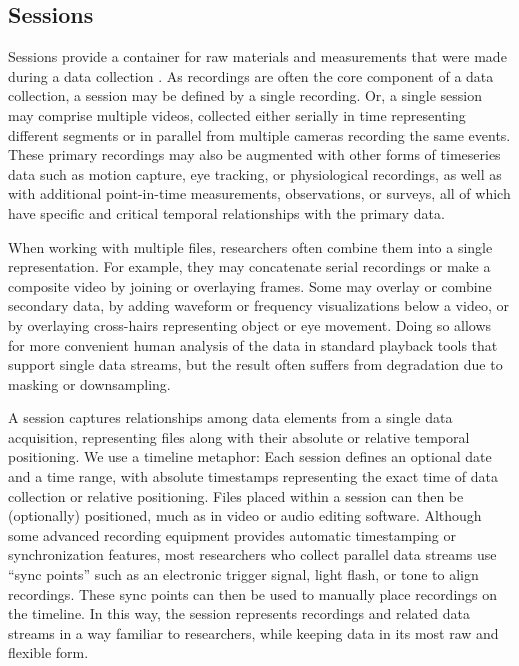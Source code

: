 \documentclass{sig-alternate}
\begin{document}
\subsection{Sessions}

Sessions provide a container for raw materials and measurements that were made during a data collection \cite{Bakeman_2012}.
As recordings are often the core component of a data collection, a session may be defined by a single recording.
Or, a single session may comprise multiple videos, collected either serially in time representing different segments or in parallel from multiple cameras recording the same events.
These primary recordings may also be augmented with other forms of timeseries data such as motion capture, eye tracking, or physiological recordings, as well as with additional point-in-time measurements, observations, or surveys, all of which have specific and critical temporal relationships with the primary data.

When working with multiple files, researchers often combine them into a single representation.
For example, they may concatenate serial recordings or make a composite video by joining or overlaying frames.
Some may overlay or combine secondary data, by adding waveform or frequency visualizations below a video, or by overlaying cross-hairs representing object or eye movement.
Doing so allows for more convenient human analysis of the data in standard playback tools that support single data streams, but the result often suffers from degradation due to masking or downsampling.

A session captures relationships among data elements from a single data acquisition, representing files along with their absolute or relative temporal positioning.
We use a timeline metaphor: Each session defines an optional date and a time range, with absolute timestamps representing the exact time of data collection or relative positioning.
Files placed within a session can then be (optionally) positioned, much as in video or audio editing software.
Although some advanced recording equipment provides automatic timestamping or synchronization features, most researchers who collect parallel data streams use ``sync points'' such as an electronic trigger signal, light flash, or tone to align recordings.
These sync points can then be used to manually place recordings on the timeline.
In this way, the session represents recordings and related data streams in a way familiar to researchers, while keeping data in its most raw and flexible form.
\end{document}
